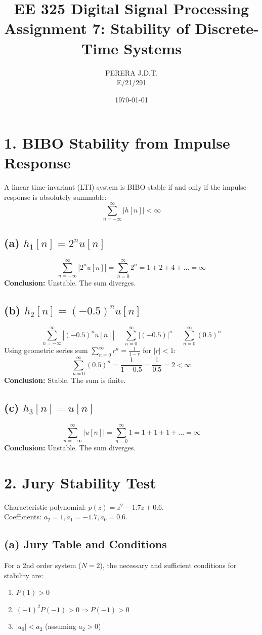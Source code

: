 \documentclass[11pt, a4paper]{article}
\title{EE 325 Digital Signal Processing \\ Assignment 7: Stability of Discrete-Time Systems}
\author{PERERA J.D.T. \\ E/21/291}
\date{\today}
\begin{document}
\maketitle

\section{1. BIBO Stability from Impulse Response}
A linear time-invariant (LTI) system is BIBO stable if and only if the impulse response is absolutely summable:
$$ \sum_{n=-\infty}^{\infty} |h[n]| < \infty $$

\subsection{(a) $h_1[n] = 2^n u[n]$}
$$ \sum_{n=-\infty}^{\infty} |2^n u[n]| = \sum_{n=0}^{\infty} 2^n = 1 + 2 + 4 + \dots = \infty $$
\textbf{Conclusion:} Unstable. The sum diverges.

\subsection{(b) $h_2[n] = (-0.5)^n u[n]$}
$$ \sum_{n=-\infty}^{\infty} |(-0.5)^n u[n]| = \sum_{n=0}^{\infty} |(-0.5)|^n = \sum_{n=0}^{\infty} (0.5)^n $$
Using geometric series sum $\sum_{n=0}^{\infty} r^n = \frac{1}{1-r}$ for $|r| < 1$:
$$ \sum_{n=0}^{\infty} (0.5)^n = \frac{1}{1-0.5} = \frac{1}{0.5} = 2 < \infty $$
\textbf{Conclusion:} Stable. The sum is finite.

\subsection{(c) $h_3[n] = u[n]$}
$$ \sum_{n=-\infty}^{\infty} |u[n]| = \sum_{n=0}^{\infty} 1 = 1 + 1 + 1 + \dots = \infty $$
\textbf{Conclusion:} Unstable. The sum diverges.

\section{2. Jury Stability Test}

Characteristic polynomial: $p(z) = z^2 - 1.7z + 0.6$. \\
Coefficients: $a_2 = 1, a_1 = -1.7, a_0 = 0.6$.

\subsection{(a) Jury Table and Conditions}
For a 2nd order system ($N=2$), the necessary and sufficient conditions for stability are:
\begin{enumerate}
    \item $P(1) > 0$
    \item $(-1)^2 P(-1) > 0 \Rightarrow P(-1) > 0$
    \item $|a_0| < a_2$ (assuming $a_2 > 0$)
\end{enumerate}
\end{document}

